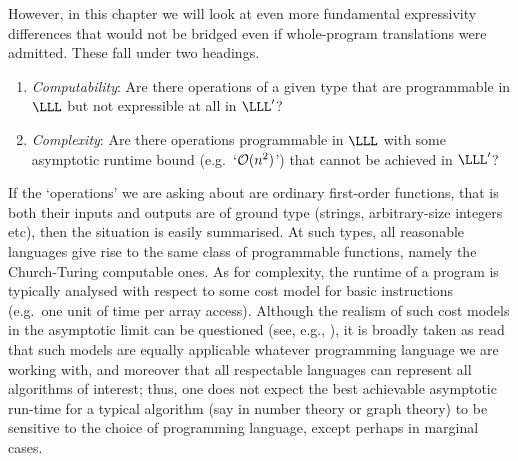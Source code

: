 \documentclass[12pt,phd,lfcs,twoside,openright,logo,leftchapter,normalheadings]{infthesis}
\theoremstyle{plain}
\theoremstyle{definition}
\begin{document}


However, in this chapter we will look at even more fundamental
expressivity differences that would not be bridged even if
whole-program translations were admitted. These fall under two
headings.
%
\begin{enumerate}
\item \emph{Computability}: Are there operations of a given type
  that are programmable in $\LLL$ but not expressible at all in $\LLL'$?
\item \emph{Complexity}: Are there operations programmable in $\LLL$
  with some asymptotic runtime bound (e.g.\ `$\mathcal{O}(n^2)$') that cannot be
  achieved in $\LLL'$?
\end{enumerate}
%

If the `operations' we are asking about are ordinary first-order
functions, that is both their inputs and outputs are of ground type
(strings, arbitrary-size integers etc), then the situation is easily
summarised.  At such types, all reasonable languages give rise to the
same class of programmable functions, namely the Church-Turing
computable ones.  As for complexity, the runtime of a program is
typically analysed with respect to some cost model for basic
instructions (e.g.\ one unit of time per array access).  Although the
realism of such cost models in the asymptotic limit can be questioned
(see, e.g., \citet[Section~2.6]{Knuth97}), it is broadly taken as read
that such models are equally applicable whatever programming language
we are working with, and moreover that all respectable languages can
represent all algorithms of interest; thus, one does not expect the
best achievable asymptotic run-time for a typical algorithm (say in
number theory or graph theory) to be sensitive to the choice of
programming language, except perhaps in marginal cases.
\end{document}
